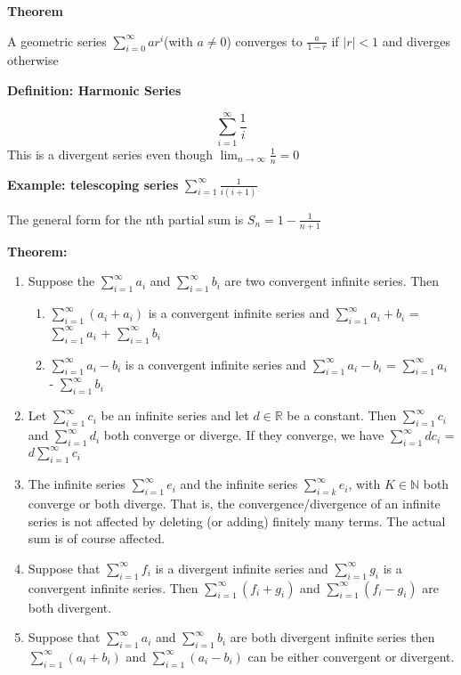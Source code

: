 \documentclass{article}
\newcommand*{\N}{\mathbb{N}}
\newcommand*{\R}{\mathbb{R}}
\begin{document}
\vspace{\baselineskip}
\textbf{Theorem}

A geometric series \(\sum^{\infty}_{i=0}ar^i\)(with \(a\neq 0\)) converges to \(\frac{a}{1-r}\) if \(|r|<1\) and diverges otherwise

\vspace{\baselineskip}
\textbf{Definition: Harmonic Series}

\begin{equation}
    \sum^{\infty}_{i=1}\frac{1}{i}
\end{equation}
This is a divergent series even though \(\lim_{n\to\infty}\frac{1}{n}=0\)

\vspace{\baselineskip}
\textbf{Example: telescoping series} \(\sum^{\infty}_{i=1}\frac{1}{i(i+1)}\)

The general form for the nth partial sum is \(S_n = 1-\frac{1}{n+1}\)

\vspace{\baselineskip}
\textbf{Theorem:}
\begin{enumerate}
    \item Suppose the \(\sum^{\infty}_{i=1}a_i\) and \(\sum^{\infty}_{i=1}b_i\) are two convergent infinite series. Then
    \begin{enumerate}
        \item \(\sum^{\infty}_{i=1}(a_i+a_i)\) is a convergent infinite series and \(\sum^{\infty}_{i=1}a_i+b_i\) = \(\sum^{\infty}_{i=1}a_i\) + \(\sum^{\infty}_{i=1}b_i\)
        \item \(\sum^{\infty}_{i=1}a_i-b_i\) is a convergent infinite series and \(\sum^{\infty}_{i=1}a_i-b_i\) = \(\sum^{\infty}_{i=1}a_i\) - \(\sum^{\infty}_{i=1}b_i\)
    \end{enumerate}
    \item Let \(\sum^{\infty}_{i=1}c_i\) be an infinite series and let \(d\in\R\) be a constant. Then \(\sum^{\infty}_{i=1}c_i\) and \(\sum^{\infty}_{i=1}d_i\) both converge or diverge. If they converge, we have \(\sum^{\infty}_{i=1}dc_i\) = \(d\sum^{\infty}_{i=1}c_i\)
    \item The infinite series \(\sum^{\infty}_{i=1}e_i\) and the infinite series \(\sum^{\infty}_{i=k}e_i\), with \(K \in \N\) both converge or both diverge. That is, the convergence/divergence of an infinite series is not affected by deleting (or adding) finitely many terms. The actual sum is of course affected.
    \item Suppose that \(\sum^{\infty}_{i=1}f_i\) is a divergent infinite series and \(\sum^{\infty}_{i=1}g_i\) is a convergent infinite series. Then \(\sum^{\infty}_{i=1}(f_i + g_i)\) and \(\sum^{\infty}_{i=1}(f_i - g_i)\) are both divergent.
    \item Suppose that \(\sum^{\infty}_{i=1}a_i\) and \(\sum^{\infty}_{i=1}b_i\) are both divergent infinite series then \(\sum^{\infty}_{i=1}(a_i+b_i)\) and \(\sum^{\infty}_{i=1}(a_i-b_i)\) can be either convergent or divergent.
\end{enumerate}
\end{document}
